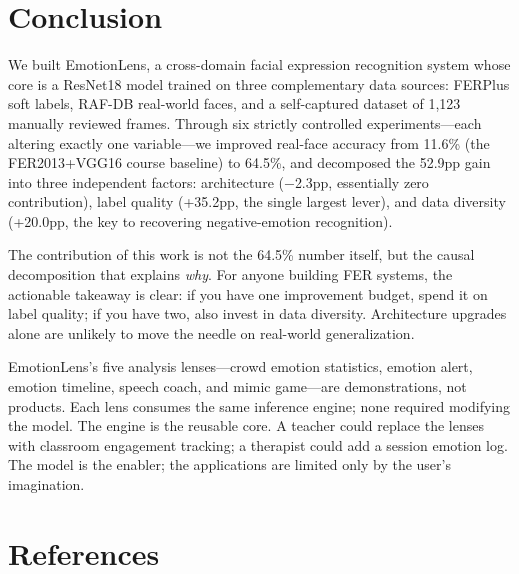 \documentclass[12pt,a4paper]{article}
\begin{document}
\section{Conclusion}

We built EmotionLens, a cross-domain facial expression recognition system whose core is a ResNet18 model trained on three complementary data sources: FERPlus soft labels, RAF-DB real-world faces, and a self-captured dataset of 1,123 manually reviewed frames. Through six strictly controlled experiments---each altering exactly one variable---we improved real-face accuracy from 11.6\% (the FER2013+VGG16 course baseline) to 64.5\%, and decomposed the 52.9pp gain into three independent factors: architecture ($-$2.3pp, essentially zero contribution), label quality (+35.2pp, the single largest lever), and data diversity (+20.0pp, the key to recovering negative-emotion recognition).

The contribution of this work is not the 64.5\% number itself, but the causal decomposition that explains \textit{why}. For anyone building FER systems, the actionable takeaway is clear: if you have one improvement budget, spend it on label quality; if you have two, also invest in data diversity. Architecture upgrades alone are unlikely to move the needle on real-world generalization.

EmotionLens's five analysis lenses---crowd emotion statistics, emotion alert, emotion timeline, speech coach, and mimic game---are demonstrations, not products. Each lens consumes the same inference engine; none required modifying the model. The engine is the reusable core. A teacher could replace the lenses with classroom engagement tracking; a therapist could add a session emotion log. The model is the enabler; the applications are limited only by the user's imagination.

\section*{References}
\end{document}
